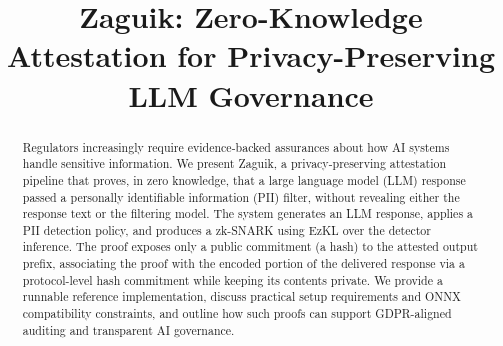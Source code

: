\documentclass[10pt,conference,a4paper]{IEEEtran}
\begin{document}
\title{Zaguik: Zero-Knowledge Attestation for Privacy-Preserving LLM Governance}
%

\author{
\and
{}
}


\maketitle


\begin{abstract}
Regulators increasingly require evidence-backed assurances about how AI systems
handle sensitive information. We present Zaguik, a privacy-preserving attestation
pipeline that proves, in zero knowledge, that a large language model (LLM)
response passed a personally identifiable information (PII) filter, without
revealing either the response text or the filtering model. The system generates
an LLM response, applies a PII detection policy, and produces a
zk-SNARK using EzKL over the detector inference. The proof exposes only a public commitment (a hash) to the attested output prefix, associating the proof with the encoded portion of the delivered response via a protocol-level hash commitment while keeping its contents private. We provide a runnable reference
implementation, discuss practical setup requirements and ONNX compatibility constraints, and outline how such
proofs can support GDPR-aligned auditing and transparent AI governance.
\end{abstract}
%

\end{document}
